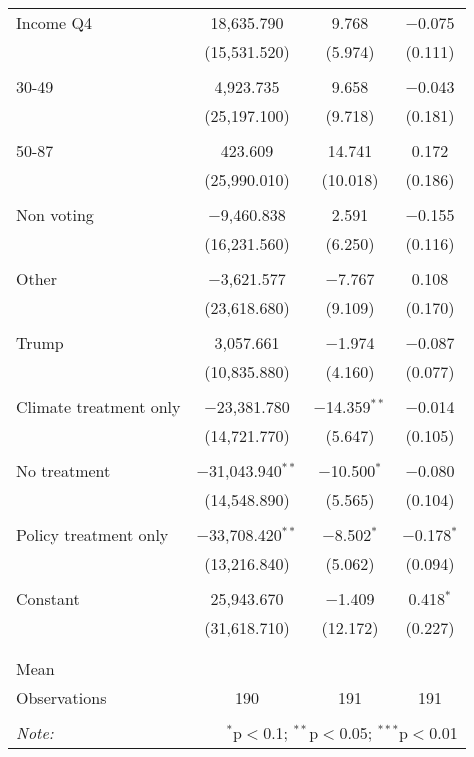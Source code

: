 \begin{tabular}{@{\extracolsep{5pt}}lccc}
 Income Q4 & 18,635.790 & 9.768 & $-$0.075 \\ 
  & (15,531.520) & (5.974) & (0.111) \\ 
  & & & \\ 
 30-49 & 4,923.735 & 9.658 & $-$0.043 \\ 
  & (25,197.100) & (9.718) & (0.181) \\ 
  & & & \\ 
 50-87 & 423.609 & 14.741 & 0.172 \\ 
  & (25,990.010) & (10.018) & (0.186) \\ 
  & & & \\ 
 Non voting & $-$9,460.838 & 2.591 & $-$0.155 \\ 
  & (16,231.560) & (6.250) & (0.116) \\ 
  & & & \\ 
 Other & $-$3,621.577 & $-$7.767 & 0.108 \\ 
  & (23,618.680) & (9.109) & (0.170) \\ 
  & & & \\ 
 Trump & 3,057.661 & $-$1.974 & $-$0.087 \\ 
  & (10,835.880) & (4.160) & (0.077) \\ 
  & & & \\ 
 Climate treatment only & $-$23,381.780 & $-$14.359$^{**}$ & $-$0.014 \\ 
  & (14,721.770) & (5.647) & (0.105) \\ 
  & & & \\ 
 No treatment & $-$31,043.940$^{**}$ & $-$10.500$^{*}$ & $-$0.080 \\ 
  & (14,548.890) & (5.565) & (0.104) \\ 
  & & & \\ 
 Policy treatment only & $-$33,708.420$^{**}$ & $-$8.502$^{*}$ & $-$0.178$^{*}$ \\ 
  & (13,216.840) & (5.062) & (0.094) \\ 
  & & & \\ 
 Constant & 25,943.670 & $-$1.409 & 0.418$^{*}$ \\ 
  & (31,618.710) & (12.172) & (0.227) \\ 
  & & & \\ 
\hline \\[-1.8ex] 
Mean &  &  &  \\ 
Observations & 190 & 191 & 191 \\ 
\hline 
\hline \\[-1.8ex] 
\textit{Note:}  & \multicolumn{3}{r}{$^{*}$p$<$0.1; $^{**}$p$<$0.05; $^{***}$p$<$0.01} \\ 
\end{tabular} 
